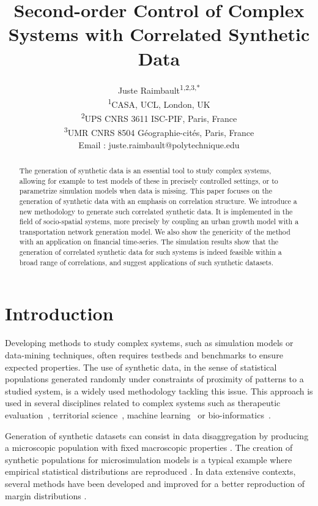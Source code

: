 \documentclass{article}
\title{Second-order Control of Complex Systems with Correlated Synthetic Data}
\date{}
\author{Juste Raimbault\textsuperscript{1,2,3,*}\medskip\\
\textsuperscript{1}CASA, UCL, London, UK\\
\textsuperscript{2}UPS CNRS 3611 ISC-PIF, Paris, France\\
\textsuperscript{3}UMR CNRS 8504 G{\'e}ographie-cit{\'e}s, Paris, France\medskip\\
Email : juste.raimbault@polytechnique.edu}
\begin{document}
\maketitle


\begin{abstract}
The generation of synthetic data is an essential tool to study complex systems, allowing for example to test models of these in precisely controlled settings, or to parametrize simulation models when data is missing. This paper focuses on the generation of synthetic data with an emphasis on correlation structure. We introduce a new methodology to generate such correlated synthetic data. It is implemented in the field of socio-spatial systems, more precisely by coupling an urban growth model with a transportation network generation model. We also show the genericity of the method with an application on financial time-series. The simulation results show that the generation of correlated synthetic data for such systems is indeed feasible within a broad range of correlations, and suggest applications of such synthetic datasets.
\end{abstract}


\justify



\section*{Introduction}


Developing methods to study complex systems, such as simulation models or data-mining techniques, often requires testbeds and benchmarks to ensure expected properties. The use of synthetic data, in the sense of statistical populations generated randomly under constraints of proximity of patterns to a studied system, is a widely used methodology tackling this issue. This approach is used in several disciplines related to complex systems such as therapeutic evaluation~\cite{abadie2010synthetic}, territorial science~\cite{moeckel2003creating,pritchard2009advances}, machine learning~\cite{bolon2013review} or bio-informatics~\cite{van2006syntren}.

Generation of synthetic datasets can consist in data disaggregation by producing a microscopic population with fixed macroscopic properties \cite{beckman1996creating}. The creation of synthetic populations for microsimulation models is a typical example where empirical statistical distributions are reproduced \cite{muller2010population}. In data extensive contexts, several methods have been developed and improved for a better reproduction of margin distributions \cite{barthelemy2013synthetic}.
\end{document}
